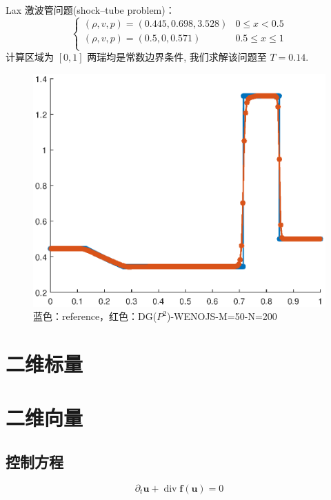 \documentclass{book}
\begin{document}
\begin{example}
\begin{example}{}{}
\begin{example}
\begin{example}{}{}
\end{example}

\begin{example}{}{}
    Lax 激波管问题(shock–tube problem)\cite{RN204}：
    \begin{equation}
        \begin{cases}
            (\rho, v, p)  =(0.445,0.698,3.528) & 0\leqslant x < 0.5         \\
            (\rho, v, p) =(0.5,0,0.571)        & 0.5\leqslant x \leqslant 1 \\
        \end{cases}
    \end{equation}
    计算区域为 $[0,1]$ 两瑞均是常数边界条件, 我们求解该问题至 $T=0.14$.
    \begin{figure}[H]
        \centering
        \label{fig:}
        \includegraphics[width=0.7\linewidth]{fig/lax.eps}
        \caption{蓝色：reference，红色：DG($P^2$)-WENOJS-M=50-N=200}
    \end{figure}

\end{example}
\section{二维标量}

\section{二维向量}
\subsection{控制方程}
\begin{equation}
    \partial_{t} \boldsymbol{u}+\operatorname{div} \boldsymbol{f} (\boldsymbol{u})=0
\end{equation}

\end{example}
\end{example}
\end{example}
\end{document}
